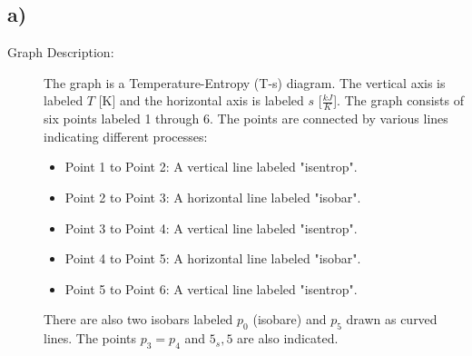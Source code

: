 

\subsection*{a)}

\begin{description}
    \item[Graph Description:] The graph is a Temperature-Entropy (T-s) diagram. The vertical axis is labeled \( T \) [K] and the horizontal axis is labeled \( s \) [\(\frac{kJ}{K}\)]. The graph consists of six points labeled 1 through 6. The points are connected by various lines indicating different processes:
    \begin{itemize}
        \item Point 1 to Point 2: A vertical line labeled "isentrop".
        \item Point 2 to Point 3: A horizontal line labeled "isobar".
        \item Point 3 to Point 4: A vertical line labeled "isentrop".
        \item Point 4 to Point 5: A horizontal line labeled "isobar".
        \item Point 5 to Point 6: A vertical line labeled "isentrop".
    \end{itemize}
    There are also two isobars labeled \( p_0 \) (isobare) and \( p_5 \) drawn as curved lines. The points \( p_3 = p_4 \) and \( 5_s, 5 \) are also indicated.
\end{description}